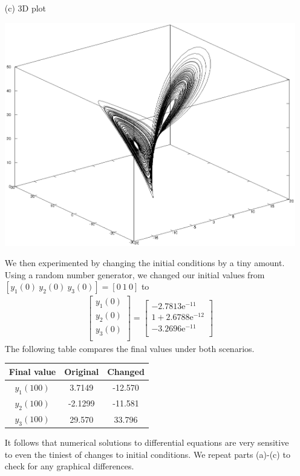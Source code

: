 \documentclass[11pt,a4paper]{article}
\begin{document}
\begin{enumerate}
	\item[(c)] 3D plot
		\begin{center}
		\includegraphics[width=1\textwidth]{threed.eps}
	\end{center}
	
	We then experimented by changing the initial conditions by a tiny amount. Using a random number generator, we changed our initial values from $[y_1(0) \ y_2(0) \ y_3(0)] = [0 \ 1 \ 0]$ to 
	\begin{align*}
		\begin{bmatrix}
			y_1(0) \\ 
			y_2(0) \\
			y_3(0) \\
		\end{bmatrix}=
			\begin{bmatrix}
			-2.7813\text{e}^{-11} \\ 
			1+2.6788\text{e}^{-12} \\
			-3.2696\text{e}^{-11} \\
		\end{bmatrix}
	\end{align*}
	The following table compares the final values under both scenarios.
	\begin{center}
		\begin{tabular}{|c|c|c|}
		\hline
		Final value &Original &Changed \\
		\hline
		$y_1(100)$ &3.7149 &-12.570 \\
		$y_2(100)$ &-2.1299 &-11.581 \\
		$y_3(100)$ &29.570 &33.796 \\ 
		\hline
		\end{tabular}
	\end{center}
	It follows that numerical solutions to differential equations are very sensitive to even the tiniest of changes to initial conditions. We repeat parts (a)-(c) to check for any graphical differences.
	

\end{enumerate}
\end{document}

